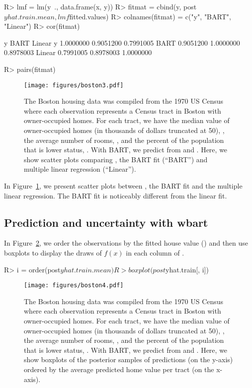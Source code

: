 \documentclass[article]{jss}
\begin{document}
\begin{Sinput}
R> lmf = lm(y~., data.frame(x, y))
R> fitmat = cbind(y, post$yhat.train.mean, lmf$fitted.values)
R> colnames(fitmat) = c("y", "BART", "Linear")
R> cor(fitmat)
\end{Sinput}
\begin{Soutput}
               y      BART    Linear
y      1.0000000 0.9051200 0.7991005
BART   0.9051200 1.0000000 0.8978003
Linear 0.7991005 0.8978003 1.0000000
\end{Soutput}
\begin{Sinput}
R> pairs(fitmat)
\end{Sinput}
\begin{figure}
\begin{center}
\texttt{[image: figures/boston3.pdf]}
\end{center}
\caption{\label{boston3}The Boston housing data was compiled from the
  1970 US Census where each observation represents a Census tract in
  Boston with owner-occupied homes. For each tract, we have the median
  value of owner-occupied homes (in thousands of dollars truncated at
  50), , the average number of rooms, , and
  the percent of the population that is lower status, .
  With BART, we predict  from  and .
  Here, we show scatter plots comparing , the BART fit
  (``BART'') and multiple linear regression (``Linear'').  }
\end{figure}
In Figure~\ref{boston3}, we present scatter plots between
, the BART fit and the multiple linear regression.
The BART fit is noticeably different from the linear fit.

\subsection{Prediction and uncertainty with wbart}

In Figure~\ref{boston4}, we order the observations by the fitted house
value () and then use boxplots to display the
draws of $f(x)$ in each column of .
\begin{Sinput}
R> i = order(post$yhat.train.mean) 
R> boxplot(post$yhat.train[, i])   
\end{Sinput}
\begin{figure}
\begin{center}
\texttt{[image: figures/boston4.pdf]}
\end{center}
\caption{\label{boston4}The Boston housing data was compiled from the
  1970 US Census where each observation represents a Census tract in
  Boston with owner-occupied homes. For each tract, we have the median
  value of owner-occupied homes (in thousands of dollars truncated at
  50), , the average number of rooms, , and the
  percent of the population that is lower status, .  With
  BART, we predict  from  and .
  Here, we show boxplots of the posterior samples of predictions (on
  the y-axis) ordered by the average predicted home value per tract
  (on the x-axis).  }
\end{figure}
\end{document}
